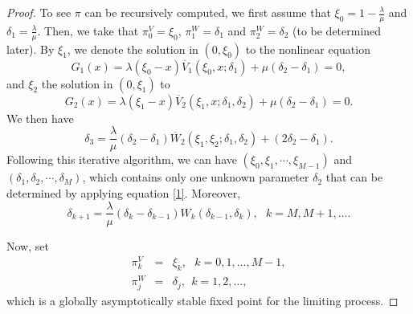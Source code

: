 \documentclass[12pt]{article}
\begin{document}
\begin{proof}
To see $\pi$ can be recursively computed, we first assume that $\xi_0=1- \frac{\lambda}{\mu}$ and $\delta_{1}=\frac{\lambda}{\mu}$. Then, we take that $\pi_{0}^{V}=\xi_0$, $\pi_{1}^{W}=\delta_{1}$ and $\pi_{2}^{W}=\delta_{2}$ (to be determined later). By $\xi_{1}$, we denote the solution in $(0,\xi_0)$ to the nonlinear equation
\begin{equation*}
  G_{1}(x)=\lambda(\xi_{0}-x)\overline{V}_{1}(\xi_{0},x;\delta_1)+\mu(\delta_2-\delta_1)=0,
\end{equation*}
and $\xi_{2}$ the solution in $(0,\xi_{1})$ to
\begin{equation*}
  G_{2}(x)=\lambda(\xi_{1}-x)\overline{V}_{2}(\xi_{1},x;\delta_1,\delta_2)+\mu(\delta_2-\delta_1)=0.
\end{equation*}
We then have
\begin{equation*}
  \delta_{3}=\frac{\lambda}{\mu}(\delta_2-\delta_1)\overline{W}_{2}(\xi_1,\xi_2;\delta_1,\delta_2)+(2\delta_2-\delta_1).
\end{equation*}
Following this iterative algorithm, we can have $(\xi_0,\xi_1,\cdots,\xi_{M-1})$ and $(\delta_{1},\delta_{2},\cdots,\delta_{M})$, which contains only one unknown parameter $\delta_2$ that can be determined by applying equation \eqref{1}.
Moreover,
\begin{equation*}
  \delta_{k+1}=\frac{\lambda}{\mu}(\delta_{k}-\delta_{k-1})W_{k}(\delta_{k-1},\delta_{k}),~~~k=M,M+1,\ldots.
\end{equation*}

Now, set
\begin{eqnarray*}
\pi_{k}^{V} &=& \xi_{k},~~~k=0,1,\ldots,M-1, \\
\pi_{j}^{W} &=& \delta_{j},~~k=1,2,\ldots,
\end{eqnarray*}
which is a globally asymptotically stable fixed point for the limiting process.


\end{proof}
\end{document}
